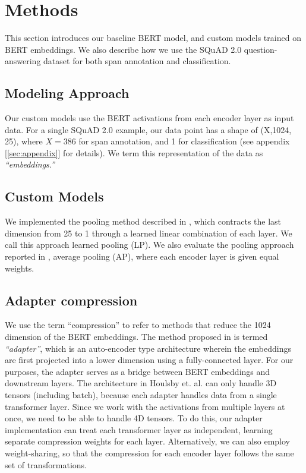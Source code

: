 \section{Methods}
\label{sec:methods}

This section introduces our baseline BERT model, and custom models trained on BERT embeddings. We also describe how we use the SQuAD 2.0 question-answering dataset for both span annotation and classification.

\subsection{Modeling Approach}

Our custom models use the BERT activations from each encoder layer as input data. For a single SQuAD 2.0 example, our data point has a shape of (X,1024, 25), where $X=386$ for span annotation, and 1 for classification (see appendix [\ref{sec:appendix}] for details). We term this representation of the data as \textit{“embeddings.”}

\subsection{Custom Models}

We implemented the pooling method described in \cite{Tenney2020}, which contracts the last dimension from 25 to 1 through a learned linear combination of each layer. We call this approach learned pooling (LP). We also evaluate the pooling approach reported in \cite{ma2019universal}, average pooling (AP), where each encoder layer is given equal weights. 

\subsection{Adapter compression}

We use the term “compression” to refer to methods that reduce the 1024 dimension of the BERT embeddings. The method proposed in \cite{DBLP:journals/corr/abs-1902-00751} is termed \textit{“adapter”}, which is an auto-encoder type architecture wherein the embeddings are first projected into a lower dimension using a fully-connected layer. For our purposes, the adapter serves as a bridge between BERT embeddings and downstream layers. The architecture in Houlsby et. al. can only handle 3D tensors (including batch), because each adapter handles data from a single transformer layer. Since we work with the activations from multiple layers at once, we need to be able to handle 4D tensors. To do this, our adapter implementation can treat each transformer layer as independent, learning separate compression weights for each layer. Alternatively, we can also employ weight-sharing, so that the compression for each encoder layer follows the same set of transformations.

